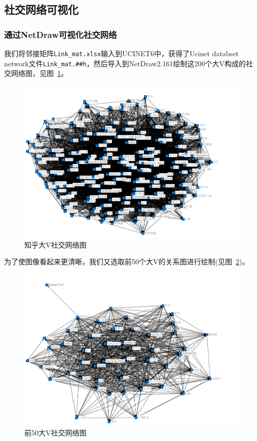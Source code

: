 \documentclass[a4paper]{article}
\begin{document}
\begin{spacing}{1.5}
\subsection{社交网络可视化}
\subsubsection{通过NetDraw可视化社交网络}
我们将邻接矩阵\verb"Link_mat.xlsx"输入到UCINET6中，获得了Ucinet databset network文件\verb"Link_mat.##h"，然后导入到NetDraw2.161绘制这200个大V构成的社交网络图，见图~\ref{netjpg}。
\begin{figure}[H]
  \centering
  \includegraphics[width=12cm]{fig/net200.pdf}
  \caption{知乎大V社交网络图}\label{netjpg}
\end{figure}

为了使图像看起来更清晰，我们又选取前50个大V的关系图进行绘制(见图~\ref{net50jpg})。
\begin{figure}[H]
  \centering
  \includegraphics[width=14cm]{fig/net50.pdf}
  \caption{前50大V社交网络图}\label{net50jpg}
\end{figure}


\end{spacing}
\end{document}
